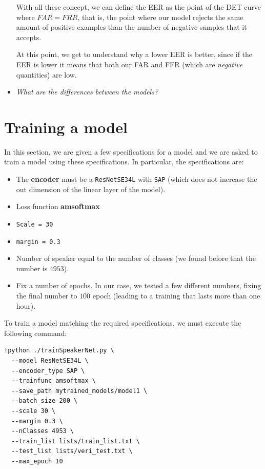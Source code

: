 \documentclass[a4paper]{article}
\def\inline{\lstinline[basicstyle=\ttfamily,keywordstyle={}]}
\begin{document}
\begin{itemize}
        With all these concept, we can define the EER as the point of the DET curve where \(FAR = FRR\), that is, the point where our model rejects the same amount of positive examples than the number of negative samples that it accepts.

        At this point, we get to understand why a lower EER is better, since if the EER is lower it means that both our FAR and FFR (which are \emph{negative} quantities) are low.
  \item \emph{What are the differences between the models?}\\



\end{itemize}


\section{Training a model}

In this section, we are given a few specifications for a model and we are asked to train a model using these specifications. In particular, the specifications are:

\begin{itemize}
  \item The \textbf{encoder} must be a \inline{ResNetSE34L} with \inline{SAP} (which does not increase the out dimension of the linear layer of the model).
  \item Loss function \textbf{amsoftmax}
  \item \inline{Scale = 30}
  \item \inline{margin = 0.3}
  \item Number of speaker equal to the number of classes (we found before that the number is \(4953\)).
        \item Fix a number of epochs. In our case, we tested a few different numbers, fixing the final number to \(100\) epoch (leading to a training that lasts more than one hour).
\end{itemize}


To train a model matching the required specifications, we must execute the following command:
\begin{verbatim}
!python ./trainSpeakerNet.py \
  --model ResNetSE34L \
  --encoder_type SAP \
  --trainfunc amsoftmax \
  --save_path mytrained_models/model1 \
  --batch_size 200 \
  --scale 30 \
  --margin 0.3 \
  --nClasses 4953 \
  --train_list lists/train_list.txt \
  --test_list lists/veri_test.txt \
  --max_epoch 10
\end{verbatim}
\end{document}
